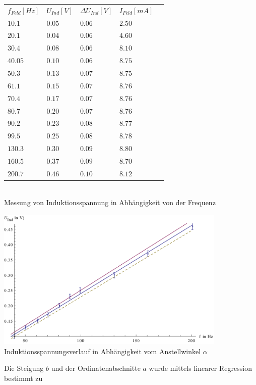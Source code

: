 \documentclass{article}
\begin{document}
\begin{center}

\begin{tabular}{l l l l l}
\(f_{Feld}[Hz]\) & \(U_{Ind}[V]\) & \(\Delta U_{Ind}[V]\) & \(I_{Feld}[mA]\) \\
\(10.1\) & \(0.05\) & \(0.06\) & \(2.50\) \\
\(20.1\) & \(0.04\)  & \(0.06\) & \(4.60\) \\
\(30.4\) & \(0.08\)  & \(0.06\) & \(8.10\) \\
\(40.05\) & \(0.10\)  & \(0.06\) & \(8.75\) \\
\(50.3\) & \(0.13\)  & \(0.07\) & \(8.75\) \\
\(61.1\) & \(0.15\)  & \(0.07\) & \(8.76\) \\
\(70.4\) & \(0.17\)  & \(0.07\) & \(8.76\) \\
\(80.7\) & \(0.20\)  & \(0.07\) & \(8.76\) \\
\(90.2\) & \(0.23\)  & \(0.08\) & \(8.77\) \\
\(99.5\) & \(0.25\)  & \(0.08\) & \(8.78\) \\
\(130.3\) & \(0.30\)  & \(0.09\) & \(8.80\) \\
\(160.5\) & \(0.37\)  & \(0.09\) & \(8.70\) \\
\(200.7\) & \(0.46\)  & \(0.10\) & \(8.12\) \\
\end{tabular}\\
Messung von Induktionsspannung in Abhängigkeit von der Frequenz\\
\end{center}
\begin{center}
  \includegraphics[width=11cm]{graph3}
	Induktionsspannungsverlauf in Abhängigkeit vom Anstellwinkel \( \alpha \)
\end{center}

Die Steigung \(b\) und der Ordinatenabschnitte \(a\) wurde mittels linearer Regression bestimmt zu
\end{document}
